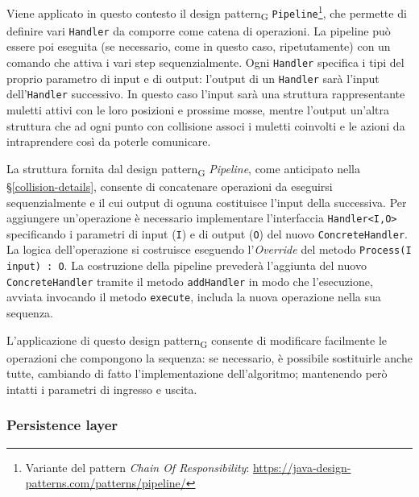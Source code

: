 Viene applicato in questo contesto il design pattern\textsubscript{G} \texttt{Pipeline}\footnote{Variante del pattern \textit{Chain Of Responsibility}: \url{https://java-design-patterns.com/patterns/pipeline/}}, che permette di definire vari \texttt{Handler} da comporre come catena di operazioni. La pipeline può essere poi eseguita (se necessario, come in questo caso, ripetutamente) con un comando che attiva i vari step sequenzialmente. Ogni \texttt{Handler} specifica i tipi del proprio parametro di input e di output: l'output di un \texttt{Handler} sarà l'input dell'\texttt{Handler} successivo.
In questo caso l'input sarà una struttura rappresentante muletti attivi con le loro posizioni e prossime mosse, mentre l'output un'altra struttura che ad ogni punto con collisione associ i muletti coinvolti e le azioni da intraprendere così da poterle comunicare.

        La struttura fornita dal design pattern\textsubscript{G} \textit{Pipeline}, come anticipato nella \S \ref{collision-details}, consente di concatenare operazioni da eseguirsi sequenzialmente e il cui output di ognuna costituisce l'input della successiva. Per aggiungere un'operazione è necessario implementare l'interfaccia \texttt{Handler<I,O>} specificando i parametri di input (\texttt{I}) e di output (\texttt{O}) del nuovo \texttt{ConcreteHandler}. La logica dell'operazione si costruisce eseguendo l'\textit{Override} del metodo \texttt{Process(I input) : O}. La costruzione della pipeline prevederà l'aggiunta del nuovo \texttt{ConcreteHandler} tramite il metodo \texttt{addHandler} in modo che l'esecuzione, avviata invocando il metodo \texttt{execute}, includa la nuova operazione nella sua sequenza.

        L'applicazione di questo design pattern\textsubscript{G} consente di modificare facilmente le operazioni che compongono la sequenza: se necessario, è possibile sostituirle anche tutte, cambiando di fatto l'implementazione dell'algoritmo; mantenendo però intatti i parametri di ingresso e uscita.



\subsubsection{Persistence layer}

